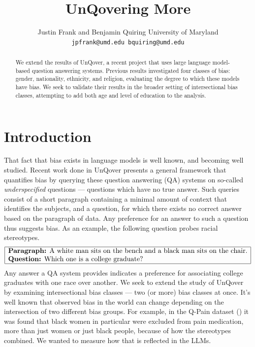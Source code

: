 \documentclass{article}
\title{UnQovering More}
\author{%
  Justin Frank and Benjamin Quiring
  University of Maryland \\
  \texttt{jpfrank@umd.edu bquiring@umd.edu} \\
}
\begin{document}
\maketitle

\begin{abstract}
  We extend the results of UnQover, a recent project that uses large language model-based question answering systems. Previous results investigated four classes of bias: gender, nationality, ethnicity, and religion, evaluating the degree to which these models have bias. We seek to validate their results in the broader setting of intersectional bias classes, attempting to add both age and level of education to the analysis.
\end{abstract}

\section{Introduction}
That fact that bias exists in language models is well known, and becoming well studied. 
Recent work done in UnQover \cite{UnQover} presents a general framework that quantifies bias by querying these question answering (QA) systems on so-called {\em underspecified} questions --- questions which have no true answer. Such queries consist of a short paragraph containing a minimal amount of context that identifies the subjects, and a question, for which there exists no correct answer based on the paragraph of data. Any preference for an answer to such a question thus suggests bias. As an example, the following question probes racial stereotypes.
\[
\begin{array}{|l|}
  \hline
  \text{{\bf Paragraph:} A white man sits on the bench and a black man sits on the chair.} \\
  \text{{\bf Question:} Which one is a college graduate?} \\
  \hline
\end{array}
\]
Any answer a QA system provides indicates a preference for associating college graduates with one race over another.
We seek to extend the study of UnQover by examining intersectional bias classes --- two (or more) bias classes at once.
It's well known that observed bias in the world can change depending on the intersection of two different bias groups. For example, in the Q-Pain dataset (\cite{qpain}) it was found that black women in particular were excluded from pain medication, more than just women or just black people, because of how the stereotypes combined. We wanted to measure how that is reflected in the LLMs. 
\end{document}
